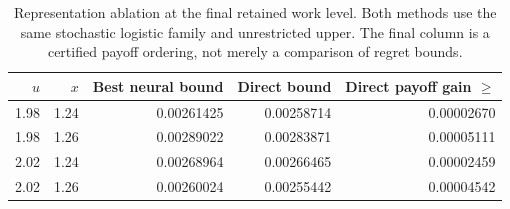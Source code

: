 \begin{table}[htbp]\centering\small
\caption{Representation ablation at the final retained work level. Both methods use the same stochastic logistic family and unrestricted upper. The final column is a certified payoff ordering, not merely a comparison of regret bounds.}
\setlength{\tabcolsep}{3pt}\begin{tabular}{rrrrr}\toprule
$u$ & $x$ & Best neural bound & Direct bound & Direct payoff gain $\geq$ \\ \midrule
1.98 & 1.24 & 0.00261425 & 0.00258714 & 0.00002670 \\
1.98 & 1.26 & 0.00289022 & 0.00283871 & 0.00005111 \\
2.02 & 1.24 & 0.00268964 & 0.00266465 & 0.00002459 \\
2.02 & 1.26 & 0.00260024 & 0.00255442 & 0.00004542 \\
\bottomrule\end{tabular}
\end{table}
